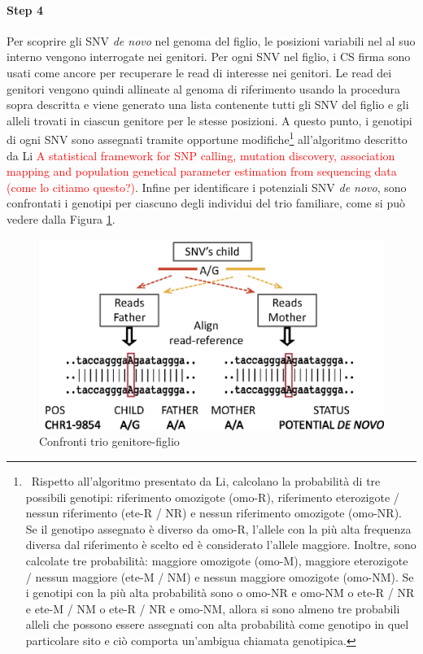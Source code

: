 \documentclass[../main.tex]{subfiles}
\begin{document}
\paragraph{Step 4} Per scoprire gli SNV \textit{de novo} nel genoma del figlio, le posizioni variabili nel al suo interno vengono interrogate nei genitori. Per ogni SNV nel figlio, i CS firma sono usati come ancore per recuperare le read di interesse nei genitori. Le read dei genitori vengono quindi allineate al genoma di riferimento usando la procedura sopra descritta e viene generato una lista contenente tutti gli SNV del figlio e gli alleli trovati in ciascun genitore per le stesse posizioni. A questo punto, i genotipi di ogni SNV sono assegnati tramite opportune modifiche\footnote{\ Rispetto all'algoritmo presentato da Li, \cite{gomez-romero2018cobasi} calcolano la probabilità di tre possibili genotipi: riferimento omozigote (omo-R), riferimento eterozigote / nessun riferimento (ete-R / NR) e nessun riferimento omozigote (omo-NR). Se il genotipo assegnato è diverso da omo-R, l'allele con la più alta frequenza diversa dal riferimento è scelto ed è considerato l'allele maggiore. Inoltre, sono calcolate tre probabilità: maggiore omozigote (omo-M), maggiore eterozigote / nessun maggiore (ete-M / NM) e nessun maggiore omozigote (omo-NM). Se i genotipi con la più alta probabilità sono o omo-NR e omo-NM o ete-R / NR e ete-M / NM o ete-R / NR e omo-NM, allora si sono almeno tre probabili alleli che possono essere assegnati con alta probabilità come genotipo in quel particolare sito e ciò comporta un'ambigua chiamata genotipica. } all'algoritmo descritto da Li \textcolor{red}{A statistical framework for SNP calling, mutation discovery, association mapping and population genetical parameter estimation from sequencing data (come lo citiamo questo?)}. Infine per identificare i potenziali SNV \textit{de novo}, sono confrontati i genotipi per ciascuno degli individui del trio familiare, come si può vedere dalla Figura \ref{fig:cobasi_align}.

 \begin{figure}[ht!]
	\centering
  	\captionsetup{justification=centering}
  	\includegraphics[scale=.20]{images/cobasi_align.png}
  	\caption{Confronti trio genitore-figlio}
  	\label{fig:cobasi_align}
\end{figure}
\end{document}
